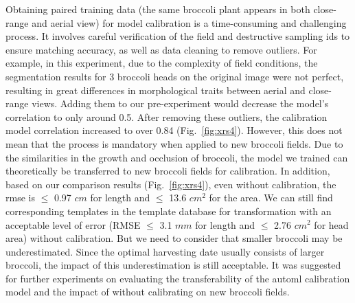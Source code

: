 Obtaining paired training data (the same broccoli plant appears in both close-range and aerial view) for model calibration is a time-consuming and challenging process. It involves careful verification of the field and destructive sampling ids to ensure matching accuracy, as well as data cleaning to remove outliers. For example, in this experiment, due to the complexity of field conditions, the segmentation results for 3 broccoli heads on the original image were not perfect, resulting in great differences in morphological traits between aerial and close-range views. Adding them to our pre-experiment would decrease the model's correlation to only around 0.5. After removing these outliers, the calibration model correlation increased to over 0.84 (Fig.~\ref{fig:xrs4}). However, this does not mean that the process is mandatory when applied to new broccoli fields. Due to the similarities in the growth and occlusion of broccoli, the model we trained can theoretically be transferred to new broccoli fields for calibration. In addition, based on our comparison results (Fig.~\ref{fig:xrs4}), even without calibration, the \gls{rmse} is $\leq$ 0.97 $cm$ for length and $\leq$ 13.6 $cm^2$ for the area.  We can still find corresponding templates in the template database for transformation with an acceptable level of error (RMSE $\leq$ 3.1 $mm$ for length and $\leq$ 2.76 $cm^2$ for head area) without calibration. But we need to consider that smaller broccoli may be underestimated. Since the optimal harvesting date usually consists of larger broccoli, the impact of this underestimation is still acceptable. It was suggested for further experiments on evaluating the transferability of the \gls{automl} calibration model and the impact of without calibrating on new broccoli fields.

